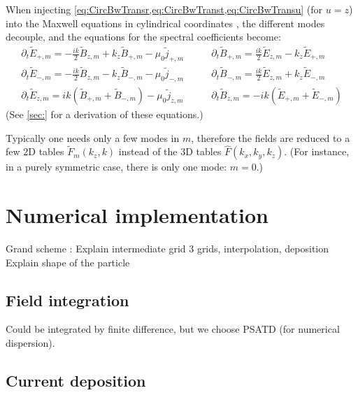 \documentclass[a4paper]{article}   	%
\begin{document}
When injecting \cref{eq:CircBwTransr,eq:CircBwTranst,eq:CircBwTransu}
(for $u=z$) into the Maxwell equations in cylindrical
coordinates \label{eq:CircMaxwellr,eq:CircMaxwellt,eq:CircMaxwellz},
the different modes decouple, and the equations for the spectral
coefficients become:
\begin{align}
\partial_t \tilde{E}_{+,m} = - \frac{ik}{2}\tilde{B}_{z,m} + k_z\tilde{B}_{+,m} - \mu_0\tilde{j}_{+,m} \qquad &   
\partial_t \tilde{B}_{+,m} = \frac{ik}{2} \tilde{E}_{z,m} - k_z \tilde{E}_{+,m} \\
\partial_t \tilde{E}_{-,m} = -\frac{ik}{2} \tilde{B}_{z,m} - k_z \tilde{B}_{-,m} - \mu_0  \tilde{j}_{-,m} \qquad &   
\partial_t \tilde{B}_{-,m} = \frac{ik}{2} \tilde{E}_{z,m} + k_z \tilde{E}_{-,m} \\
\partial_t \tilde{E}_{z,m} = ik ( \tilde{B}_{+,m} + \tilde{B}_{-,m} ) - \mu_0 \tilde{j}_{z,m}  \qquad & 
\partial_t \tilde{B}_{z,m} = -ik ( \tilde{E}_{+,m} + \tilde{E}_{-,m} )
\end{align}
(See \cref{sec:} for a derivation of these equations.)
 

Typically one needs only a few modes in $m$, therefore the fields are reduced to
a few 2D tables $\tilde{F}_m(k_z,k)$ instead of the 3D tables
$\hat{F}(k_x,k_y,k_z)$. (For instance, in a purely symmetric case, there is only one
mode: $m=0$.)




\section{Numerical implementation}

Grand scheme :
Explain intermediate grid
3 grids, interpolation, deposition 
Explain shape of the particle

\subsection{Field integration}

Could be integrated by finite difference, but we choose PSATD (for numerical dispersion).

\subsection{Current deposition}

\subsection{} 

\newpage
\appendix


\end{document}
